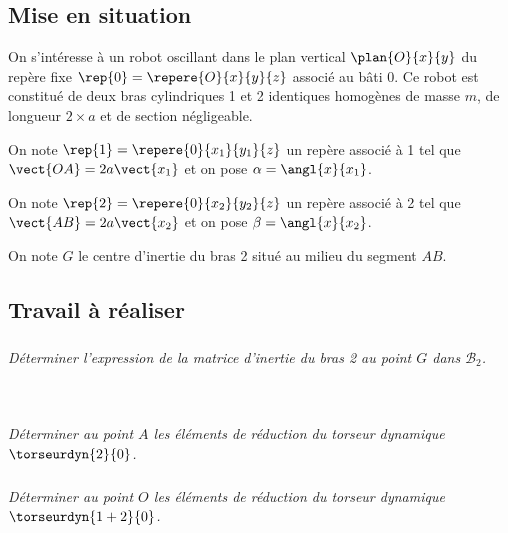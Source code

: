 \ifprof
\else
\begin{multicols}{2}
\fi

\subsection*{Mise en situation}
On s’intéresse à un robot oscillant dans le plan vertical $\plan{O}{x}{y}$ du repère fixe $\rep{0}=\repere{O}{x}{y}{z}$
associé au bâti 0.
Ce robot est constitué de deux bras cylindriques 1 et 2 identiques homogènes de masse $m$, de longueur
$2\times a$ et de section négligeable.

On note $\rep{1}=\repere{0}{x_1}{y_1}{z}$ un repère associé à 1 tel que $\vect{OA}=2a\vect{x_1}$ et on pose
$\alpha=\angl{x}{x_1}$. 

On note $\rep{2}=\repere{0}{x_2}{y_2}{z}$ un repère associé à 2 tel que $\vect{AB}=2a\vect{x_2}$ et on pose
$\beta=\angl{x}{x_2}$. 

On note $G$ le centre d’inertie du bras 2 situé au milieu du segment $AB$.

\subsection*{Travail à réaliser}

\subparagraph{}
\textit{Déterminer l'expression de la matrice d'inertie du bras 2 au point $G$ dans $\mathcal{B}_2$.}
\ifprof
\begin{corrige}
~\\
\end{corrige}
\else
\fi



\subparagraph{}
\textit{Déterminer au point $A$ les éléments de réduction du torseur dynamique $\torseurdyn{2}{0}$.}
\ifprof
\begin{corrige}
\end{corrige}
\else
\fi

\subparagraph{}
\textit{Déterminer au point $O$ les éléments de réduction du torseur dynamique $\torseurdyn{1+2}{0}$.}
\ifprof
\begin{corrige}
\end{corrige}
\else
\fi



\ifprof


\end{multicols}
